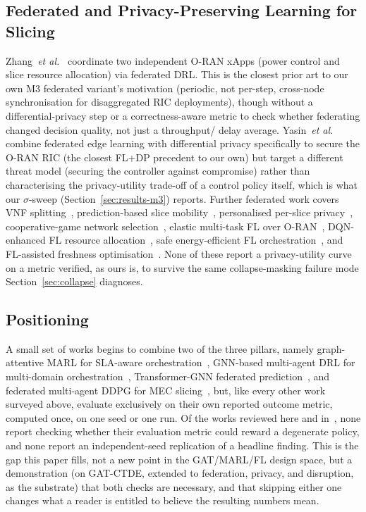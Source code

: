 \documentclass[journal]{IEEEtran}
\begin{document}
\subsection{Federated and Privacy-Preserving Learning for Slicing}
Zhang~\emph{et al.}~\cite{zhang2022federatedoran} coordinate two
independent O-RAN xApps (power control and slice resource allocation)
via federated DRL. This is the closest prior art to our own M3 federated
variant's motivation (periodic, not per-step, cross-node
synchronisation for disaggregated RIC deployments), though without a
differential-privacy step or a correctness-aware metric to check
whether federating changed decision quality, not just a throughput/
delay average. Yasin~\emph{et al.}~\cite{yasin2025dpfl} combine
federated edge learning with differential privacy specifically to
secure the O-RAN RIC (the closest FL+DP precedent to our own) but
target a different threat model (securing the controller against
compromise) rather than characterising the privacy-utility trade-off
of a control policy itself, which is what our $\sigma$-sweep
(Section~\ref{sec:results-m3}) reports. Further federated work covers
VNF splitting~\cite{amiri2024fedvnf}, prediction-based slice
mobility~\cite{ming2024fedmobility}, personalised per-slice
privacy~\cite{kwantwi2025pfl}, cooperative-game network
selection~\cite{gonzalez2024fedns}, elastic multi-task FL over
O-RAN~\cite{abdisarabshali2026elasticfl}, DQN-enhanced FL resource
allocation~\cite{gong2024dqnfl}, safe energy-efficient FL
orchestration~\cite{koursioumpas2024safefl,wu2024cefl}, and
FL-assisted freshness optimisation~\cite{liu2026aoifl}. None of these
report a privacy-utility curve on a metric verified, as ours is, to
survive the same collapse-masking failure mode
Section~\ref{sec:collapse} diagnoses.

\subsection{Positioning}
A small set of works begins to combine two of the three pillars,
namely graph-attentive MARL for SLA-aware orchestration~\cite{mohajer2026pronto},
GNN-based multi-agent DRL for multi-domain
orchestration~\cite{bouroudi2025gnnmarl}, Transformer-GNN federated
prediction~\cite{qasim2025tgnnfl}, and federated multi-agent DDPG for
MEC slicing~\cite{gong2026femaddpg}, but, like every other work
surveyed above, evaluate exclusively on their own reported outcome
metric, computed once, on one seed or one run. Of the works reviewed
here and in~\cite{ref:access}, none report checking whether their
evaluation metric could reward a degenerate policy, and none report an
independent-seed replication of a headline finding. This is the gap
this paper fills, not a new point in the GAT/MARL/FL design space, but
a demonstration (on GAT-CTDE, extended to federation, privacy, and
disruption, as the substrate) that both checks are necessary, and
that skipping either one changes what a reader is entitled to believe
the resulting numbers mean.
\end{document}
